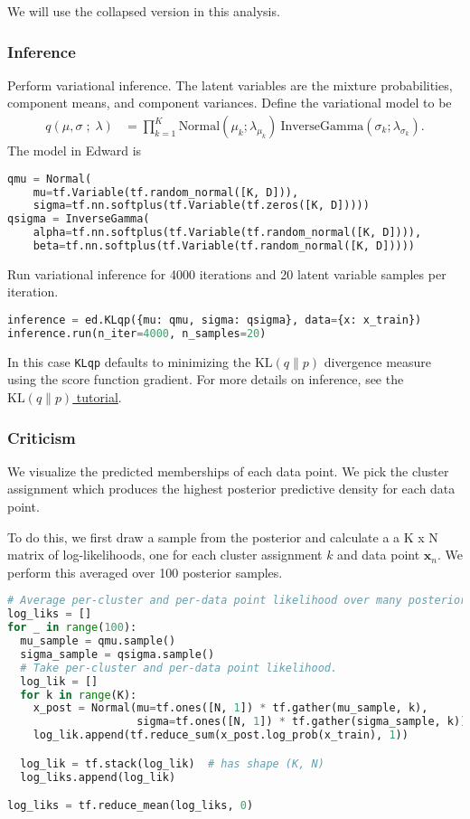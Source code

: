 We will use the collapsed version in this analysis.


\subsubsection{Inference}
Perform variational inference.
%
The latent variables are the mixture probabilities,
component means, and component variances.
Define the variational model to be
\begin{align*}
 q(\mu, \sigma \;;\; \lambda)
 &=
 \prod_{k=1}^K
 \text{Normal}(\mu_k; \lambda_{\mu_k})
 ~
 \text{InverseGamma}(\sigma_k; \lambda_{\sigma_k}).
\end{align*}
The model in Edward is
\begin{lstlisting}[language=Python]
qmu = Normal(
    mu=tf.Variable(tf.random_normal([K, D])),
    sigma=tf.nn.softplus(tf.Variable(tf.zeros([K, D]))))
qsigma = InverseGamma(
    alpha=tf.nn.softplus(tf.Variable(tf.random_normal([K, D]))),
    beta=tf.nn.softplus(tf.Variable(tf.random_normal([K, D]))))
\end{lstlisting}

Run variational inference for 4000 iterations and 20 latent variable
samples per iteration.
\begin{lstlisting}[language=Python]
inference = ed.KLqp({mu: qmu, sigma: qsigma}, data={x: x_train})
inference.run(n_iter=4000, n_samples=20)
\end{lstlisting}
In this case
\texttt{KLqp} defaults to minimizing the
$\text{KL}(q\|p)$ divergence measure using the score function
gradient.
For more details on inference, see the \href{/tutorials/klqp}{$\text{KL}(q\|p)$ tutorial}.


\subsubsection{Criticism}

We visualize the predicted memberships of each data point.
We pick the cluster assignment which produces
the highest posterior predictive density for each data point.

To do this, we first draw a sample from the posterior and calculate a
a K x N matrix of log-likelihoods, one for each cluster assignment $k$
and data point $\mathbf{x}_n$. We perform this averaged over 100
posterior samples.
\begin{lstlisting}[language=Python]
# Average per-cluster and per-data point likelihood over many posterior samples.
log_liks = []
for _ in range(100):
  mu_sample = qmu.sample()
  sigma_sample = qsigma.sample()
  # Take per-cluster and per-data point likelihood.
  log_lik = []
  for k in range(K):
    x_post = Normal(mu=tf.ones([N, 1]) * tf.gather(mu_sample, k),
                    sigma=tf.ones([N, 1]) * tf.gather(sigma_sample, k))
    log_lik.append(tf.reduce_sum(x_post.log_prob(x_train), 1))

  log_lik = tf.stack(log_lik)  # has shape (K, N)
  log_liks.append(log_lik)

log_liks = tf.reduce_mean(log_liks, 0)
\end{lstlisting}

